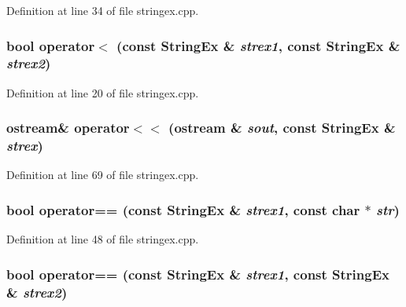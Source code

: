 Definition at line 34 of file stringex.cpp.\hypertarget{classStringEx_8ad4eaa758cf41431e7ad34e253fda8e}{
\subsubsection[{operator$<$}]{\setlength{\rightskip}{0pt plus 5cm}bool operator$<$ (const {\bf StringEx} \& {\em strex1}, \/  const {\bf StringEx} \& {\em strex2})}}
\label{classStringEx_8ad4eaa758cf41431e7ad34e253fda8e}




Definition at line 20 of file stringex.cpp.\hypertarget{classStringEx_d356a5f383f559309131d50ba6363d8a}{
\subsubsection[{operator$<$$<$}]{\setlength{\rightskip}{0pt plus 5cm}ostream\& operator$<$$<$ (ostream \& {\em sout}, \/  const {\bf StringEx} \& {\em strex})}}
\label{classStringEx_d356a5f383f559309131d50ba6363d8a}




Definition at line 69 of file stringex.cpp.\hypertarget{classStringEx_529ca0692be82a0d7713aef9dc6b5034}{
\subsubsection[{operator==}]{\setlength{\rightskip}{0pt plus 5cm}bool operator== (const {\bf StringEx} \& {\em strex1}, \/  const char $\ast$ {\em str})}}
\label{classStringEx_529ca0692be82a0d7713aef9dc6b5034}




Definition at line 48 of file stringex.cpp.\hypertarget{classStringEx_73912fae5fd55593d41c26b62a165e69}{
\subsubsection[{operator==}]{\setlength{\rightskip}{0pt plus 5cm}bool operator== (const {\bf StringEx} \& {\em strex1}, \/  const {\bf StringEx} \& {\em strex2})}}
\label{classStringEx_73912fae5fd55593d41c26b62a165e69}





